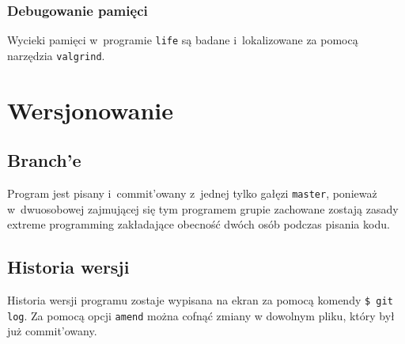 \documentclass[a4paper,12pt,oneside]{article}
\begin{document}
\subsubsection{Debugowanie pamięci}
Wycieki pamięci w~programie \verb+life+ są badane i~lokalizowane za pomocą narzędzia \verb+valgrind+.

\section{Wersjonowanie}

\subsection{Branch'e}
Program jest pisany i~commit'owany z~jednej tylko gałęzi \verb+master+, ponieważ w~dwuosobowej zajmującej się tym programem grupie zachowane zostają zasady extreme programming zakładające obecność dwóch osób podczas pisania kodu.

\subsection{Historia wersji}
Historia wersji programu zostaje wypisana na ekran za pomocą komendy \verb+$ git log+. Za pomocą opcji \verb+amend+ można cofnąć zmiany w dowolnym pliku, który był już commit'owany.
\end{document}
